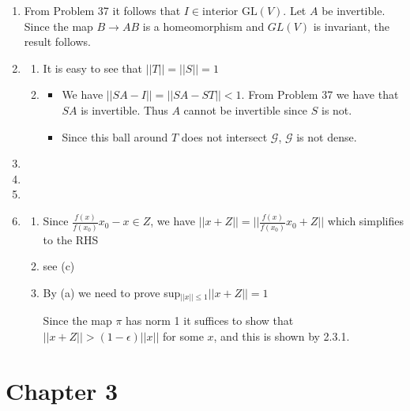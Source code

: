 \documentclass{article}
\begin{document}
\begin{enumerate}
\begin{enumerate}
        Now use Corollary 3 of Section 1.3 of Perko.
    \end{enumerate} 

    \item From Problem 37 it follows that $I \in \text{interior }\text{GL}(V)$. Let $A$ be invertible. Since the map $B \to AB$ is a homeomorphism and $GL(V)$ is invariant, the result follows.

    \item 
    \begin{enumerate}
        
        \item It is easy to see that $||T||=||S||=1$
        \item 
        \begin{itemize}
            \item We have $||SA-I||=||SA-ST|| <1$. From Problem 37 we have that $SA$ is invertible. Thus $A$ cannot be invertible since $S$ is not.

            \item  Since this ball around $T$ does not intersect $\mathcal{G}$, $\mathcal{G}$ is not dense.
        \end{itemize}
        
    \end{enumerate}

    \item 
    \item 
    \item 
    
    \item \begin{enumerate}
        \item Since $\frac{f(x)}{f(x_0)}x_0 - x\in Z$, we have $||x+Z||=||\frac{f(x)}{f(x_0)}x_0+Z||$ which simplifies to the RHS
        \item see (c)
        \item By (a) we need to prove sup$_{||x|| \leq 1}||x+Z||=1$
        
        Since the map $\pi$ has norm 1 it suffices to show that $||x+Z||>(1-\epsilon)||x||$ for some $x$, and this is shown by 2.3.1.
    \end{enumerate}
\end{enumerate}

\section*{Chapter 3}
\end{document}
